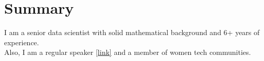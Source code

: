 \documentclass[letterpaper]{deedy-resume} %
\begin{document}


\begin{minipage}[t][0.2\textheight][t]{\textwidth}



\section{Summary} 

\begin{flushleft}
I am a senior data scientist with solid mathematical background and 6+ years of experience.
\\
Also, I am a regular speaker \href{https://github.com/LenaVolzhina/personal}{[link]} and a member of women tech communities.
\end{flushleft}
\sectionspace
\end{minipage}

\end{document}
